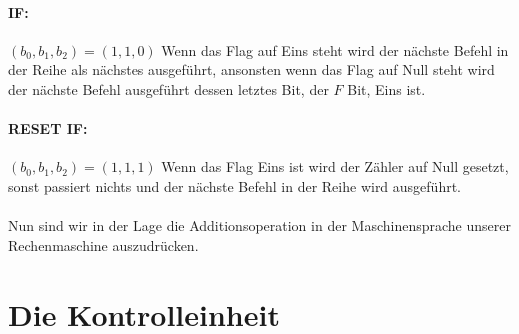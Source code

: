 \documentclass[11pt,a4paper,leqno]{report}
\numberwithin{equation}{chapter}
\begin{document}
\paragraph{IF:} $(b_0, b_1, b_2) = (1, 1, 0)$ Wenn das Flag auf Eins steht wird der nächste Befehl in der Reihe als nächstes ausgeführt, ansonsten wenn das Flag auf Null steht wird der nächste Befehl ausgeführt dessen letztes Bit, der $F$ Bit, Eins ist.
\paragraph{RESET IF:} $(b_0, b_1, b_2) = (1, 1, 1)$ Wenn das Flag Eins ist wird der Zähler auf Null gesetzt, sonst passiert nichts und der nächste Befehl in der Reihe wird ausgeführt.
\\
\\
Nun sind wir in der Lage die Additionsoperation in der Maschinensprache unserer Rechenmaschine auszudrücken.

\section{Die Kontrolleinheit}
\end{document}
